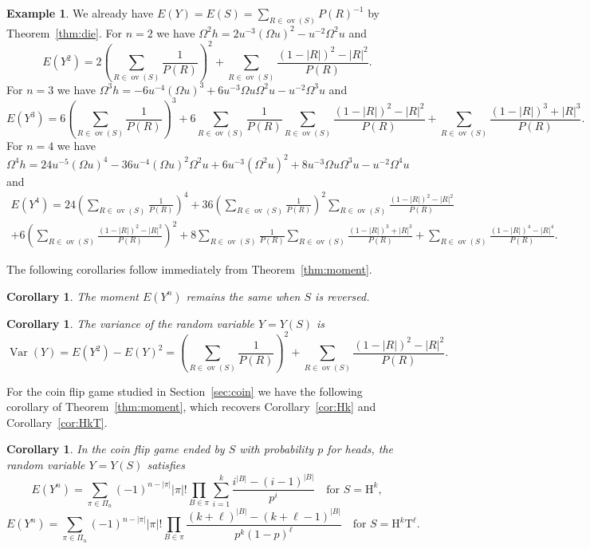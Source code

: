 \documentclass[10pt]{amsart}
\newtheorem{corollary}[theorem]{Corollary}
\theoremstyle{definition}
\newtheorem{example}[theorem]{Example}
\theoremstyle{remark}
\newcommand{\HH}{\mathrm{H}} \newcommand{\TT}{\mathrm{T}}
\DeclareMathOperator{\overlap}{ov}
\DeclareMathOperator{\Var}{Var}
\begin{document}
\begin{example}
We already have $E(Y) = E(S) = \sum_{R\in\overlap(S)} P(R)^{-1}$ by Theorem~\ref{thm:die}.
For $n=2$ we have $\Omega^2 h = 2u^{-3}(\Omega u)^2 - u^{-2}\Omega^2 u$ and
\[
E(Y^2) = 2\left(\sum_{R\in\overlap(S)} \frac{1}{P(R)} \right)^2
+ \sum_{R\in\overlap(S)} \frac{(1-|R|)^2-|R|^2}{P(R)}.
\]
For $n=3$ we have $\Omega^3 h = -6u^{-4}(\Omega u)^3 + 6u^{-3} \Omega u \Omega^2 u - u^{-2}\Omega^3 u$ and
\[
E(Y^3) = 6\left(\sum_{R\in\overlap(S)} \frac{1}{P(R)} \right)^3
+ 6 \sum_{R\in\overlap(S)} \frac{1}{P(R)} \sum_{R\in\overlap(S)} \frac{(1-|R|)^2-|R|^2}{P(R)}
+ \sum_{R\in\overlap(S)} \frac{(1-|R|)^3+|R|^3}{P(R)}.
\]
For $n=4$ we have $\Omega^4 h = 24u^{-5}(\Omega u)^4 - 36 u^{-4}(\Omega u)^2 \Omega^2 u + 6u^{-3} (\Omega^2 u)^2 + 8u^{-3} \Omega u \Omega^3 u - u^{-2}\Omega^4 u$ and
\begin{multline*}
E(Y^4) = 24\left(\sum_{R\in\overlap(S)} \frac{1}{P(R)} \right)^4
+36 \left(\sum_{R\in\overlap(S)} \frac{1}{P(R)} \right)^2 \sum_{R\in\overlap(S)} \frac{(1-|R|)^2-|R|^2}{P(R)} \\
+6 \left(\sum_{R\in\overlap(S)} \frac{(1-|R|)^2-|R|^2}{P(R)}\right)^2 
+8 \sum_{R\in\overlap(S)} \frac{1}{P(R)} \sum_{R\in\overlap(S)} \frac{(1-|R|)^3+|R|^3}{P(R)}
+ \sum_{R\in\overlap(S)} \frac{(1-|R|)^4 - |R|^4}{P(R)}.
\end{multline*}
\end{example}

The following corollaries follow immediately from Theorem~\ref{thm:moment}.
\begin{corollary}
The moment $E(Y^n)$ remains the same when $S$ is reversed.
\end{corollary}

\begin{corollary}
The variance of the random variable $Y=Y(S)$ is 
\[ 
\Var(Y) = E(Y^2) - E(Y)^2 
= \left(\sum_{R\in\overlap(S)} \frac{1}{P(R)} \right)^2
+ \sum_{R\in\overlap(S)} \frac{(1-|R|)^2-|R|^2}{P(R)}.
\]
\end{corollary}


For the coin flip game studied in Section~\ref{sec:coin} we have the following corollary of 
Theorem~\ref{thm:moment}, which recovers Corollary~\ref{cor:Hk} and Corollary~\ref{cor:HkT}.

\begin{corollary}
In the coin flip game ended by $S$ with probability $p$ for heads, the random variable $Y=Y(S)$ satisfies
\[
E(Y^n) = \sum_{\pi\in\Pi_n} (-1)^{n-|\pi|} |\pi|! \prod_{B\in \pi} \sum_{i=1}^k \frac{i^{|B|} - (i-1)^{|B|}}{p^i}
\quad \text{for } S=\HH^k,
\]
\[ 
E(Y^n) = \sum_{\pi\in\Pi_n} (-1)^{n-|\pi|} |\pi|! \prod_{B\in \pi} \frac{(k+\ell)^{|B|}-(k+\ell-1)^{|B|}}{p^k(1-p)^\ell}
\quad \text{for } S=\HH^k\TT^\ell.
\]
\end{corollary}
\end{document}
